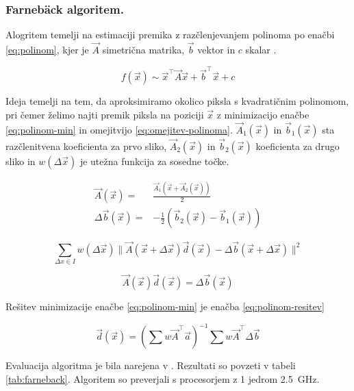 \subsubsection{Farneb{\"a}ck algoritem.}
Alogritem temelji na estimaciji premika z razčlenjevanjem polinoma  po enačbi \eqref{eq:polinom}, kjer je $\vec{A}$ simetrična matrika, $\vec{b}$ vektor in $c$ skalar \cite{farneback2003two}.

\begin{equation}\label{eq:polinom}
	f(\vec{x}) \sim \vec{x}^\top \vec{A} \vec{x} + \vec{b}^\top \vec{x} + c
\end{equation}

Ideja temelji na tem, da aproksimiramo okolico piksla s kvadratičnim polinomom, pri čemer želimo najti premik piksla na poziciji $\vec{x}$ z minimizacijo enačbe \eqref{eq:polinom-min} in omejitvijo \eqref{eq:omejitev-polinoma}. $\vec{A}_1(\vec{x})$ in $\vec{b}_1(\vec{x})$ sta razčlenitvena koeficienta za prvo sliko, $\vec{A}_2(\vec{x})$ in $\vec{b}_2(\vec{x})$ koeficienta za drugo sliko in $w(\Delta\vec{x})$ je utežna funkcija za sosedne točke.

\begin{align}
\vec{A}(\vec{x}) = & \frac{\vec{A}_1(\vec{x} + \vec{A}_2(\vec{x}))}{2} \\
\Delta\vec{b}(\vec{x}) = & - \frac{1}{2}\left(\vec{b}_2(\vec{x}) - \vec{b}_1(\vec{x})\right) 
\end{align}

\begin{equation}\label{eq:polinom-min}
\sum_{\Delta x \in I} w(\Delta\vec{x}) \| \vec{A}(\vec{x} + \Delta\vec{x})\vec{d}(\vec{x}) - \Delta\vec{b}(\vec{x} +\Delta\vec{x}) \|^2
\end{equation}

\begin{equation}\label{eq:omejitev-polinoma}
\vec{A}(\vec{x})\vec{d}(\vec{x}) = \Delta\vec{b}(\vec{x})
\end{equation}

Rešitev minimizacije enačbe \eqref{eq:polinom-min} je enačba \eqref{eq:polinom-resitev}

\begin{equation}\label{eq:polinom-resitev}
 \vec{d}(\vec{x}) = \left( \sum w \vec{A}^\top \vec{a} \right)^{-1} \sum w \vec{A}^\top \Delta\vec{b}
\end{equation}

Evaluacija algoritma je bila narejena v \cite{Geiger2012CVPR}. Rezultati so povzeti v tabeli \ref{tab:farneback}. Algoritem so preverjali s procesorjem z 1 jedrom \@ \SI{2.5}{GHz}.

